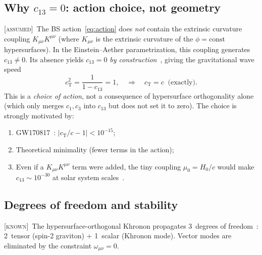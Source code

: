 \documentclass[prd,twocolumn,superscriptaddress,longbibliography,floatfix]{revtex4-2}
\newcommand{\cT}{c_{\mathrm{T}}}
\newcommand{\known}{\textsc{[known]}}
\newcommand{\assumed}{\textsc{[assumed]}}
\begin{document}
\subsection{Why $c_{13} = 0$: action choice, not geometry}
\label{sec:c13}

\assumed\  The BS action~\eqref{eq:action} does \emph{not} contain
the extrinsic curvature coupling $K_{\mu\nu}K^{\mu\nu}$ (where
$K_{\mu\nu}$ is the extrinsic curvature of the $\phi = \mathrm{const}$
hypersurfaces).  In the Einstein--Aether parametrization, this
coupling generates $c_{13} \neq 0$.  Its absence yields
$c_{13} = 0$ \emph{by construction}~\cite{BS2024}, giving the
gravitational wave speed
\begin{equation}
\cT^2 = \frac{1}{1 - c_{13}} = 1,
\quad\Longrightarrow\quad \cT = c \;\;\text{(exactly)}.
\label{eq:cT}
\end{equation}
This is a \emph{choice of action}, not a consequence of hypersurface
orthogonality alone (which only merges $c_1, c_3$ into $c_{13}$ but
does not set it to zero).  The choice is strongly motivated by:
\begin{enumerate}
\item GW170817~\cite{GW170817}: $|c_{\mathrm{T}}/c - 1| < 10^{-15}$;
\item Theoretical minimality (fewer terms in the action);
\item Even if a $K_{\mu\nu}K^{\mu\nu}$ term were added, the tiny
  coupling $\mu_0 = H_0/c$ would make $c_{13} \sim 10^{-30}$ at
  solar system scales~\cite{OostMW2018}.
\end{enumerate}

\subsection{Degrees of freedom and stability}
\label{sec:stability}

\known\  The hypersurface-orthogonal Khronon propagates 3~degrees
of freedom~\cite{BPS2010}: 2~tensor (spin-2 graviton) + 1~scalar
(Khronon mode).  Vector modes are eliminated by the constraint
$\omega_{\mu\nu} = 0$.
\end{document}
